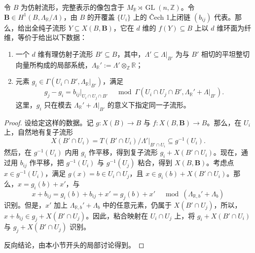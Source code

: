 \begin{proposition}\label{prop:6.54}
令 $B$ 为仿射流形，完整表示的像包含于 $M_{\mathbb R}\rtimes\operatorname{GL}(n,\mathbb Z)$。令 $\mathbf B\in H^1(B,\Lambda_{\mathbb R}/\Lambda)$，由 $B$ 的开覆盖 $\{U_i\}$ 上的 Čech 1上闭链 $(b_{ij})$ 代表。那么，给出全纯子流形 $Y\subseteq X(B,\mathbf B)$，它在 $d$ 维的 $f(Y)\subseteq B$ 上以 $d$ 维环面为纤维，等价于给出以下数据：
\begin{enumerate}[label=(\arabic*)]
\item 一个 $d$ 维有理仿射子流形 $B'\subseteq B$，其中，$\Lambda'\subseteq\Lambda|_{B'}$ 为与 $B'$ 相切的平坦整切向量所构成的局部系统，$\Lambda_{\mathbb R}':=\Lambda'\otimes_{\mathbb Z}\mathbb R$；
\item 元素 $g_i\in\Gamma(U_i\cap B',\Lambda_{\mathbb R}|_{B'})$，满足
\[
g_j-g_i=b_{ij}|_{U_i\cap U_j\cap B'}
\quad\bmod\Gamma(U_i\cap U_j\cap B',\Lambda_{\mathbb R}'+\Lambda|_{B'}).
\]
这里，$g_i$ 只在模去 $\Lambda_{\mathbb R}'+\Lambda|_{B'}$ 的意义下指定同一子流形。
\end{enumerate}
\end{proposition}
\begin{proof}
设给定这样的数据。记 $g\colon X(B)\to B$ 与 $f\colon X(B,\mathbf B)\to B$。那么，在 $U_i$ 上，自然地有复子流形
\[
X(B'\cap U_i)=T(B'\cap U_i)/\Lambda'|_{B'\cap U_i}
\subseteq g^{-1}(U_i).
\]
然后，在 $g^{-1}(U_i)$ 内用 $g_i$ 作平移，得到复子流形 $g_i+X(B'\cap U_i)$。现在，通过用 $b_{ij}$ 作平移，把 $g^{-1}(U_i)$ 与 $g^{-1}(U_j)$ 粘合，得到 $X(B,\mathbf B)$。考虑点 $x\in g^{-1}(U_i)$，满足 $g(x)=b\in U_i\cap U_j$，且 $x\in g_i(b)+X(B'\cap U_i)$。那么，$x=g_i(b)+x'$，与
\[
x+b_{ij}=g_i(b)+b_{ij}+x'
=g_j(b)+x'\quad\bmod(\Lambda_{\mathbb R,b}'+\Lambda_b)
\]
识别。但是，$x'$ 加上 $\Lambda_{\mathbb R,b}'+\Lambda_b$ 中的任意元素，仍属于 $X(B'\cap U_j)$，所以，$x+b_{ij}\in g_j+X(B'\cap U_j)$。因此，粘合映射在 $U_i\cap U_j$ 上，将 $g_i+X(B'\cap U_i)$ 与 $g_j+X(B'\cap U_j)$ 识别。

反向结论，由本小节开头的局部讨论得到。
\end{proof}

